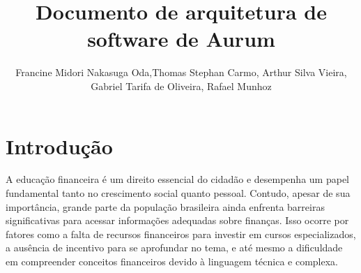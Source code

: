 \documentclass[
	article,			%
	12pt,				%
	oneside,			%
	a4paper,			%
	english,			%
	brazil,				%
	sumario=tradicional
	]{abntex2}
\title{Documento de arquitetura de software de Aurum}
\author{Francine Midori Nakasuga Oda\inst{1},Thomas Stephan Carmo\inst{1}, Arthur Silva Vieira\inst{1},\\ Gabriel Tarifa de Oliveira\inst{1}, Rafael Munhoz\inst{1} }
\begin{document}


\frenchspacing 


%
%

\maketitle







\textual

\section{Introdução}

A educação financeira é um direito essencial do cidadão e desempenha um papel fundamental tanto no crescimento social quanto pessoal. Contudo, apesar de sua importância, grande parte da população brasileira ainda enfrenta barreiras significativas para acessar informações adequadas sobre finanças. Isso ocorre por fatores como a falta de recursos financeiros para investir em cursos especializados, a ausência de incentivo para se aprofundar no tema, e até mesmo a dificuldade em compreender conceitos financeiros devido à linguagem técnica e complexa.
\end{document}
